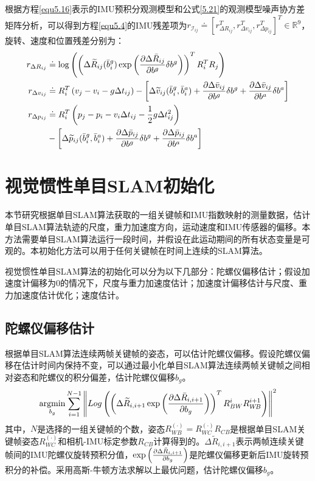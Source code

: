 根据方程\ref{equ5.16}表示的IMU预积分观测模型和公式\ref{5.21}的观测模型噪声协方差矩阵分析，可以得到方程\ref{equ5.4}的IMU残差项为$r_{\mathcal{I}_{ij}} \doteq \left[ r_{\Delta R_{ij}}^T,r_{\Delta v_{ij}}^T, r_{\Delta p_{ij}}^T \right]^T \in \mathds{R}^9 $，旋转、速度和位置残差分别为：
\begin{equation}
\label{equ5.27}
\begin{aligned}
r_{\Delta R_{ij}} & \doteq \log \left( \left( \Delta \widetilde{R}_{ij}(\bar{b}_i^g) \exp \left( { \partial \Delta \bar{R}_{ij} \over \partial b^g } \delta b^g \right) \right)^T R_i^T R_j  \right) \\
r_{\Delta v_{ij}} & \doteq R_i^T \left(v_j-v_i-g\Delta t_{ij} \right) - \left[ \Delta \widetilde{v}_{ij}(\bar{b}_i^g,\bar{b}_i^a) + { \partial \Delta \bar{v}_{ij} \over \partial b^g } \delta b^g + { \partial \Delta \bar{v}_{ij} \over \partial b^a } \delta b^a  \right] \\
r_{\Delta p_{ij}} & \doteq R_i^T \left( p_j-p_i-v_i \Delta t_{ij} -{1 \over 2} g \Delta t_{ij}^2 \right) \\
& - \left[ \Delta \widetilde{p}_{ij}(\bar{b}_i^g,\bar{b}_i^a) + { \partial \Delta \bar{p}_{ij} \over \partial b^g } \delta b^g + { \partial \Delta \bar{p}_{ij} \over \partial b^a } \delta b^a  \right]
\end{aligned}
\end{equation}


\section{视觉惯性单目SLAM初始化}
本节研究根据单目SLAM算法获取的一组关键帧和IMU指数映射的测量数据，估计单目SLAM算法轨迹的尺度，重力加速度方向，运动速度和IMU传感器的偏移。本方法需要单目SLAM算法运行一段时间，并假设在此运动期间的所有状态变量是可观的。本初始化方法可以用于任何关键帧在时间上连续的SLAM算法。

视觉惯性单目SLAM算法的初始化可以分为以下几部分：陀螺仪偏移估计；假设加速度计偏移为0的情况下，尺度与重力加速度估计；加速度计偏移估计与尺度、重力加速度估计优化；速度估计。

\subsection{陀螺仪偏移估计}
根据单目SLAM算法连续两帧关键帧的姿态，可以估计陀螺仪偏移。假设陀螺仪偏移在估计时间内保持不变，可以通过最小化单目SLAM算法连续两帧关键帧之间相对姿态和陀螺仪的积分偏差，估计陀螺仪偏移$b_g$。
\begin{equation}
\label{•}
\operatorname*{argmin}\limits_{b_g}\sum\limits_{i=1}^{N-1} \left \Vert Log \left( \left( \Delta \widetilde{R}_{i,i+1} \exp \left( { \partial \Delta \bar{R}_{i,i+1} \over \partial b_g  } \right) \right)^T R_{BW}^i R_{W\!B}^{i+1} \right)  \right \Vert^2
\end{equation}
其中，$N$是选择的一组关键帧的个数，姿态$R_{W\!B}^{(\cdot)}=R_{WC}^{(\cdot)}R_{CB}$是根据单目SLAM关键帧姿态$R_{WC}^{(\cdot)}$和相机-IMU标定参数$R_{CB}$计算得到的。$\Delta \widetilde{R}_{i,i+1}$表示两帧连续关键帧间的IMU陀螺仪旋转预积分值，$\exp \left( { \partial \Delta \bar{R}_{i,i+1} \over \partial b_g  } \right)$是陀螺仪偏移更新后IMU旋转预积分的补偿。采用高斯-牛顿方法求解以上最优问题，估计陀螺仪偏移$b_g$。


